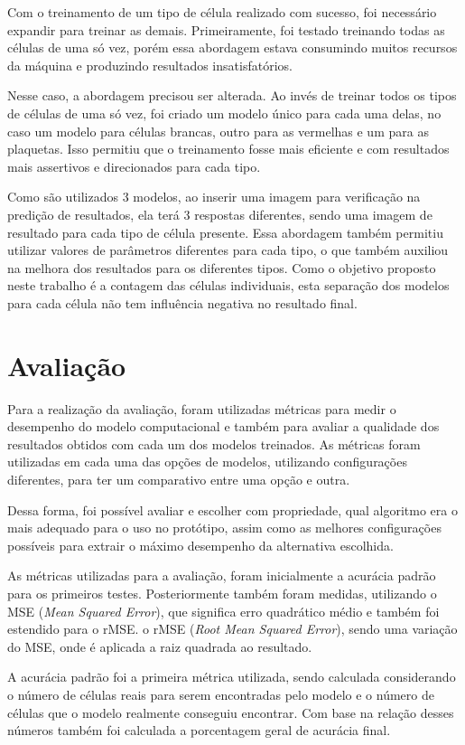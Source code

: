 Com o treinamento de um tipo de célula realizado com sucesso, foi necessário expandir para treinar as demais. Primeiramente, foi testado treinando todas as células de uma só vez, porém essa abordagem estava consumindo muitos recursos da máquina e produzindo resultados insatisfatórios.

Nesse caso, a abordagem precisou ser alterada. Ao invés de treinar todos os tipos de células de uma só vez, foi criado um modelo único para cada uma delas, no caso um modelo para células brancas, outro para as vermelhas e um para as plaquetas. Isso permitiu que o treinamento fosse mais eficiente e com resultados mais assertivos e direcionados para cada tipo.

Como são utilizados 3 modelos, ao inserir uma imagem para verificação na predição de resultados, ela terá 3 respostas diferentes, sendo uma imagem de resultado para cada tipo de célula presente. Essa abordagem também permitiu utilizar valores de parâmetros diferentes para cada tipo, o que também auxiliou na melhora dos resultados para os diferentes tipos. Como o objetivo proposto neste trabalho é a contagem das células individuais, esta separação dos modelos para cada célula não tem influência negativa no resultado final.

\section{Avaliação}
Para a realização da avaliação, foram utilizadas métricas para medir o desempenho do modelo computacional e também para avaliar a qualidade dos resultados obtidos com cada um dos modelos treinados. As métricas foram utilizadas em cada uma das opções de modelos, utilizando configurações diferentes, para ter um comparativo entre uma opção e outra.

Dessa forma, foi possível avaliar e escolher com propriedade, qual algoritmo era o mais adequado para o uso no protótipo, assim como as melhores configurações possíveis para extrair o máximo desempenho da alternativa escolhida.

As métricas utilizadas para a avaliação, foram inicialmente a acurácia padrão para os primeiros testes. Posteriormente também foram medidas, utilizando o MSE (\emph{Mean Squared Error}), que significa erro quadrático médio e também foi estendido para o rMSE. o rMSE (\emph{Root Mean Squared Error}), sendo uma variação do MSE, onde é aplicada a raiz quadrada ao resultado.

A acurácia padrão foi a primeira métrica utilizada, sendo calculada considerando o número de células reais para serem encontradas pelo modelo e o número de células que o modelo realmente conseguiu encontrar. Com base na relação desses números também foi calculada a porcentagem geral de acurácia final.

